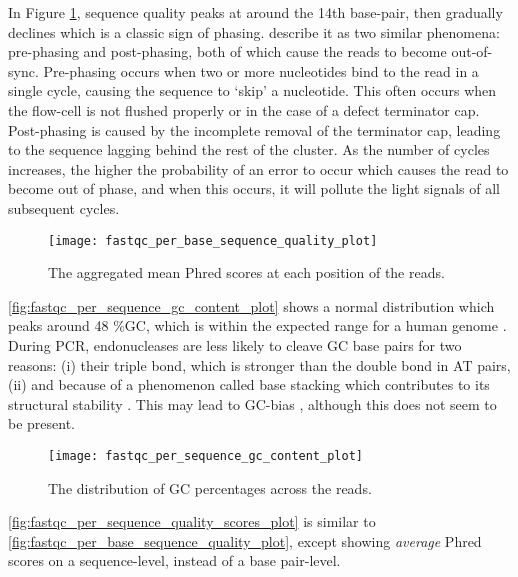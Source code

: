 \newpage
In Figure \ref{fig:fastqc_per_base_sequence_quality_plot}, sequence quality peaks at around the 14th base-pair, then gradually declines which is a classic sign of phasing. \cite{pfeiffer2018systematic} describe it as two similar phenomena: pre-phasing and post-phasing, both of which cause the reads to become out-of-sync. Pre-phasing occurs when two or more nucleotides bind to the read in a single cycle, causing the sequence to ‘skip’ a nucleotide. This often occurs when the flow-cell is not flushed properly or in the case of a defect terminator cap. Post-phasing is caused by the incomplete removal of the terminator cap, leading to the sequence lagging behind the rest of the cluster. As the number of cycles increases, the higher the probability of an error to occur which causes the read to become out of phase, and when this occurs, it will pollute the light signals of all subsequent cycles.


\begin{figure}[!h]
    \centering
    \texttt{[image: fastqc\_per\_base\_sequence\_quality\_plot]}
    \caption{The aggregated mean Phred scores at each position of the reads.} %
    \label{fig:fastqc_per_base_sequence_quality_plot}
\end{figure}

\newpage
\autoref{fig:fastqc_per_sequence_gc_content_plot} shows a normal distribution which peaks around 48 \%GC, which is within the expected range for a human genome \citep{meunier2004recombination}. During PCR, endonucleases are less likely to cleave GC base pairs for two reasons: (i) their triple bond, which is stronger than the double bond in AT pairs, (ii) and because of  a phenomenon called base stacking which contributes to its structural stability \citep{yakovchuk2006base}. This may lead to GC-bias \citep{benjamini2012summarizing}, although this does not seem to be present.

\begin{figure}[!h]
    \centering
    \texttt{[image: fastqc\_per\_sequence\_gc\_content\_plot]}
    \caption{The distribution of GC percentages across the reads.}
    \label{fig:fastqc_per_sequence_gc_content_plot}
\end{figure}

\newpage
\autoref{fig:fastqc_per_sequence_quality_scores_plot} is similar to  \autoref{fig:fastqc_per_base_sequence_quality_plot}, except showing \textit{average} Phred scores on a sequence-level, instead of a base pair-level.


